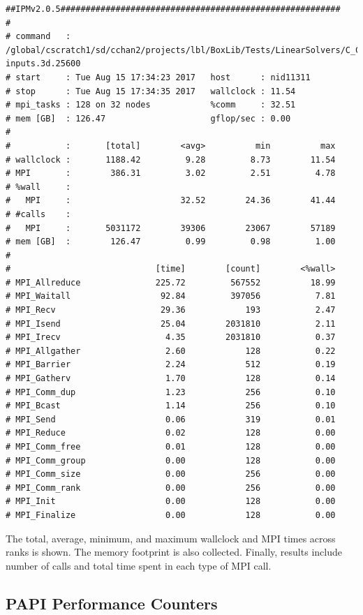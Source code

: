 \begin{verbatim}
##IPMv2.0.5########################################################
#
# command   : /global/cscratch1/sd/cchan2/projects/lbl/BoxLib/Tests/LinearSolvers/C_CellMG/./main3d.intel.MPI.OMP.ex.ipm inputs.3d.25600 
# start     : Tue Aug 15 17:34:23 2017   host      : nid11311        
# stop      : Tue Aug 15 17:34:35 2017   wallclock : 11.54
# mpi_tasks : 128 on 32 nodes            %comm     : 32.51
# mem [GB]  : 126.47                     gflop/sec : 0.00
#
#           :       [total]        <avg>          min          max
# wallclock :       1188.42         9.28         8.73        11.54 
# MPI       :        386.31         3.02         2.51         4.78 
# %wall     :
#   MPI     :                      32.52        24.36        41.44 
# #calls    :
#   MPI     :       5031172        39306        23067        57189
# mem [GB]  :        126.47         0.99         0.98         1.00 
#
#                             [time]        [count]        <%wall>
# MPI_Allreduce               225.72         567552          18.99
# MPI_Waitall                  92.84         397056           7.81
# MPI_Recv                     29.36            193           2.47
# MPI_Isend                    25.04        2031810           2.11
# MPI_Irecv                     4.35        2031810           0.37
# MPI_Allgather                 2.60            128           0.22
# MPI_Barrier                   2.24            512           0.19
# MPI_Gatherv                   1.70            128           0.14
# MPI_Comm_dup                  1.23            256           0.10
# MPI_Bcast                     1.14            256           0.10
# MPI_Send                      0.06            319           0.01
# MPI_Reduce                    0.02            128           0.00
# MPI_Comm_free                 0.01            128           0.00
# MPI_Comm_group                0.00            128           0.00
# MPI_Comm_size                 0.00            256           0.00
# MPI_Comm_rank                 0.00            256           0.00
# MPI_Init                      0.00            128           0.00
# MPI_Finalize                  0.00            128           0.00
\end{verbatim}

The total, average, minimum, and maximum wallclock and MPI times across ranks is shown.
The memory footprint is also collected.
Finally, results include number of calls and total time spent in each type of MPI call.

\subsection{PAPI Performance Counters}

